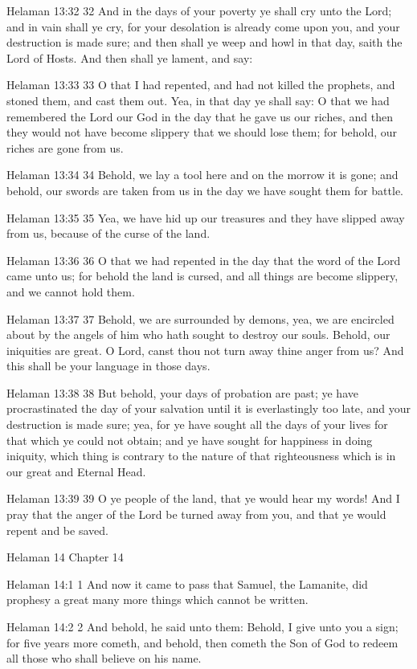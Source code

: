 Helaman 13:32
 32 And in the days of your poverty ye shall cry unto the Lord;
and in vain shall ye cry, for your desolation is already come
upon you, and your destruction is made sure; and then shall ye
weep and howl in that day, saith the Lord of Hosts. And then
shall ye lament, and say:

Helaman 13:33
 33 O that I had repented, and had not killed the prophets, and
stoned them, and cast them out. Yea, in that day ye shall say: O
that we had remembered the Lord our God in the day that he gave
us our riches, and then they would not have become slippery that
we should lose them; for behold, our riches are gone from us.

Helaman 13:34
 34 Behold, we lay a tool here and on the morrow it is gone; and
behold, our swords are taken from us in the day we have sought
them for battle.

Helaman 13:35
 35 Yea, we have hid up our treasures and they have slipped away
from us, because of the curse of the land.

Helaman 13:36
 36 O that we had repented in the day that the word of the Lord
came unto us; for behold the land is cursed, and all things are
become slippery, and we cannot hold them.

Helaman 13:37
 37 Behold, we are surrounded by demons, yea, we are encircled
about by the angels of him who hath sought to destroy our souls.
Behold, our iniquities are great. O Lord, canst thou not turn
away thine anger from us? And this shall be your language in
those days.

Helaman 13:38
 38 But behold, your days of probation are past; ye have
procrastinated the day of your salvation until it is
everlastingly too late, and your destruction is made sure; yea,
for ye have sought all the days of your lives for that which ye
could not obtain; and ye have sought for happiness in doing
iniquity, which thing is contrary to the nature of that
righteousness which is in our great and Eternal Head.

Helaman 13:39
 39 O ye people of the land, that ye would hear my words! And I
pray that the anger of the Lord be turned away from you, and that
ye would repent and be saved.

Helaman 14
Chapter 14

Helaman 14:1
 1 And now it came to pass that Samuel, the Lamanite, did
prophesy a great many more things which cannot be written.

Helaman 14:2
 2 And behold, he said unto them: Behold, I give unto you a sign;
for five years more cometh, and behold, then cometh the Son of
God to redeem all those who shall believe on his name.

